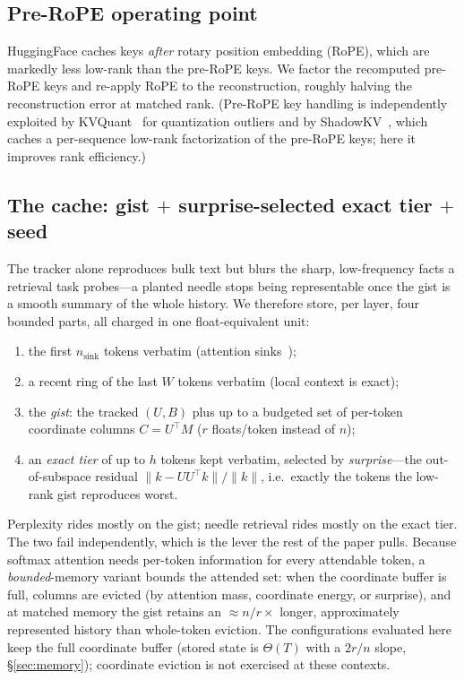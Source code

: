 \documentclass[11pt]{article}
\begin{document}
\subsection{Pre-RoPE operating point}
\label{sec:prerope}
HuggingFace caches keys \emph{after} rotary position embedding (RoPE), which are
markedly less low-rank than the pre-RoPE keys. We factor the recomputed pre-RoPE
keys and re-apply RoPE to the reconstruction, roughly halving the reconstruction
error at matched rank. (Pre-RoPE key handling is independently exploited by
KVQuant~\citep{hooper2024kvquant} for quantization outliers and by
ShadowKV~\citep{sun2024shadowkv}, which caches a per-sequence low-rank
factorization of the pre-RoPE keys; here it improves rank efficiency.)

\subsection{The cache: gist $+$ surprise-selected exact tier $+$ seed}
\label{sec:cache}
The tracker alone reproduces bulk text but blurs the sharp, low-frequency facts a
retrieval task probes---a planted needle stops being representable once the gist
is a smooth summary of the whole history. We therefore store, per layer, four
bounded parts, all charged in one float-equivalent unit:
\begin{enumerate}[leftmargin=1.6em]
\item the first $n_{\text{sink}}$ tokens verbatim (attention
sinks~\citep{xiao2024streamingllm});
\item a recent ring of the last $W$ tokens verbatim (local context is exact);
\item the \emph{gist}: the tracked $(U, B)$ plus up to a budgeted set of
per-token coordinate columns $C = U^\top M$ ($r$ floats/token instead of $n$);
\item an \emph{exact tier} of up to $h$ tokens kept verbatim, selected by
\emph{surprise}---the out-of-subspace residual $\|k - U U^\top k\|/\|k\|$, i.e.\
exactly the tokens the low-rank gist reproduces worst.
\end{enumerate}
Perplexity rides mostly on the gist; needle retrieval rides mostly on the exact
tier. The two fail independently, which is the lever the rest of the paper pulls.
Because softmax attention needs per-token information for every attendable token,
a \emph{bounded}-memory variant bounds the attended set: when the coordinate
buffer is full, columns are evicted (by attention mass, coordinate energy, or
surprise), and at matched memory the gist retains an $\approx n/r\times$ longer,
approximately represented history than whole-token eviction. The configurations
evaluated here keep the full coordinate buffer (stored state is $\Theta(T)$ with a
$2r/n$ slope, \S\ref{sec:memory}); coordinate eviction is not exercised at these
contexts.
\end{document}
